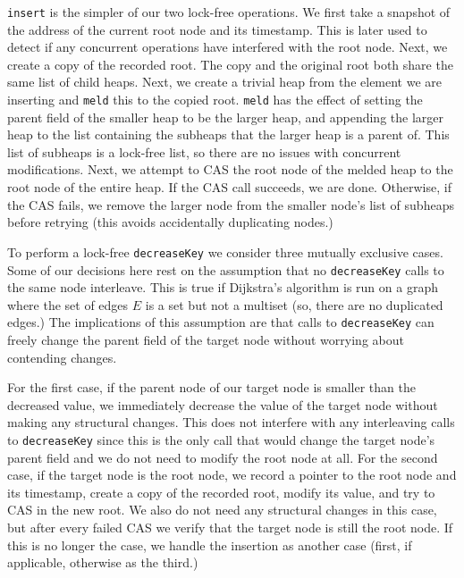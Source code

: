 \documentclass{acm_proc_article-sp}
\begin{document}
\texttt{insert} is the simpler of our two lock-free operations. We
first take a snapshot of the address of the current
root node and its timestamp. This is later used to detect if any
concurrent operations
have interfered with the root node. Next, we create a copy of the recorded
root. The copy and the original root both share the same list of child heaps.
Next, we create a trivial heap from the element we are inserting and \texttt{meld} this
to the copied root. \texttt{meld} has the effect of setting the parent field of the smaller
heap to be the larger heap, and appending the larger heap to the list containing the subheaps
that the larger heap is a parent of. This list of subheaps is a lock-free list, so there are no
issues with concurrent modifications. Next, we attempt to CAS the root node of the melded heap
to the root node of the entire heap. If the CAS call succeeds, we are done. Otherwise,
if the CAS fails, we remove
the larger node from the smaller node's list of subheaps before retrying (this avoids accidentally duplicating nodes.)

To perform a lock-free \texttt{decreaseKey} we consider three mutually exclusive cases.
Some of our decisions here rest on the assumption that no \texttt{decreaseKey} calls to the
same node interleave. This is true if Dijkstra's algorithm is run on a graph where the set
of edges $E$ is a set but not a multiset (so, there are no duplicated edges.) The implications
of this assumption are that calls to \texttt{decreaseKey} can freely change the parent field of the
target node without worrying about contending changes.

For the first case, 
if the parent node of our target node is smaller than the decreased value, we immediately decrease
the value of the target node without making any structural changes. This does not interfere with
any interleaving calls to \texttt{decreaseKey} since this is the only call that would change
the target node's parent field and we do not need to modify the root node at all.
For the second case, if the target node is the root node, we record a pointer to the root node and its timestamp, create
a copy of the recorded root, modify its value, and try to CAS in the new root. 
We also do not need any structural changes in this case, but
after every failed CAS we verify that the target node is still the root node. If this is no longer the case,
we handle the insertion as another case (first, if applicable, otherwise as the third.)
\end{document}

